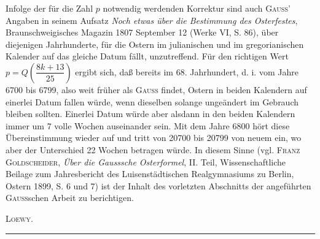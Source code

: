 Infolge der für die Zahl $p$ notwendig werdenden Korrektur sind auch \textsc{Gauss}' Angaben in seinem Aufsatz \textit{Noch etwas über die Bestimmung des Osterfestes}, Braunschweigisches Magazin 1807 September 12 (Werke VI, S. 86), über diejenigen Jahrhunderte, für die Ostern im julianischen und im gregorianischen Kalender auf das gleiche Datum fällt, unzutreffend. Für den richtigen Wert $p=Q\left(\dfrac{8k+13}{25}\right)$ ergibt sich, daß bereits im 68. Jahrhundert, d. i. vom Jahre 6700 bis 6799, also weit früher als \textsc{Gauss} findet, Ostern in beiden Kalendern auf einerlei Datum fallen würde, wenn dieselben solange ungeändert im Gebrauch bleiben sollten. Einerlei Datum würde aber alsdann in den beiden Kalendern immer um 7 volle Wochen auseinander sein. Mit dem Jahre 6800 hört diese Übereinstimmung wieder auf und tritt von 20700 bis 20799 von neuem ein, wo aber der Unterschied 22 Wochen betragen würde. In diesem Sinne (vgl. \textsc{Franz Goldscheider}, \textit{Über die Gausssche Osterformel}, II. Teil, Wissenschaftliche Beilage zum Jahresbericht des Luisenstädtischen Realgymnasiums zu Berlin, Ostern 1899, S. 6 und 7) ist der Inhalt des vorletzten Abschnitts der angeführten \textsc{Gauss}schen Arbeit zu berichtigen.
\begin{flushright}\textsc{Loewy.}\end{flushright}
\endgroup
\begin{center}\rule{.24\textwidth}{.35pt}\end{center}
\clearpage\endgroup
